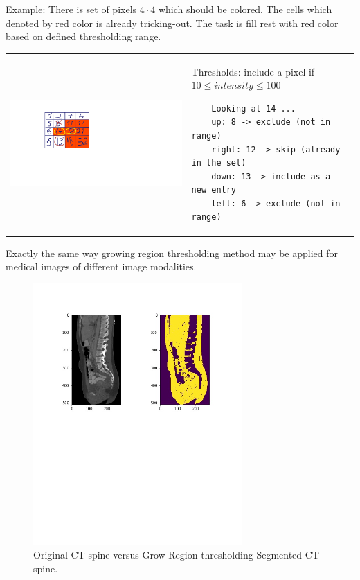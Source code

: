 Example: There is set of pixels $4 \cdot 4$ which should be colored. The cells which denoted by red color is already tricking-out. The task is fill rest with red color based on defined thresholding range.       

\begin{tabular}{C{7cm}  L{7cm}}
    \includegraphics[width=12cm]{images/grow_region_3.png} & Thresholds: include a pixel if $10 \leq intensity \leq 100$ \newline 
    \begin{lstlisting}
    Looking at 14 ...
    up: 8 -> exclude (not in range)
    right: 12 -> skip (already in the set)
    down: 13 -> include as a new entry
    left: 6 -> exclude (not in range)
    \end{lstlisting}
\end{tabular}

Exactly the same way growing region thresholding method may be applied for medical images of different image modalities.
\begin{figure}[h]
    \centering \includegraphics[width=8cm]{images/ct-spine-grow-region-segmented.jpg}
    \vspace*{-50mm} \caption {Original CT spine versus Grow Region thresholding Segmented CT spine.}
\end{figure}    

